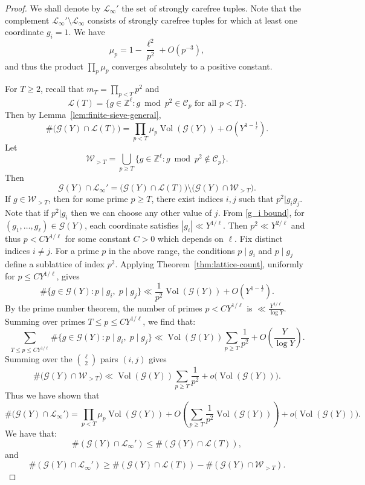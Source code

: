 \documentclass[10pt,a4paper]{amsart}
\begin{document}
\begin{proof}
We shall denote by $\mathcal L_\infty'$ the set of strongly carefree tuples. Note that the complement $\mathcal L_\infty'\setminus \mathcal L_\infty$ consists of strongly carefree tuples for which at least one coordinate $g_i=1$. We have
\[
\mu_p
=
1-\frac{\ell^2}{p^2}
+O(p^{-3}),
\]and thus the product $\prod_p\mu_p$ converges absolutely to a positive constant.
\par For $T\ge2$, recall that $m_T=\prod_{p<T}p^2$ and 
\[\mathcal L(T)
=
\{g\in\mathbb Z^\ell :
g\bmod p^2\in\mathcal C_p
\text{ for all } p<T\}.
\]
Then by Lemma~\ref{lem:finite-sieve-general},
\[
\#\bigl(\mathcal G(Y)\cap\mathcal L(T)\bigr)
=
\prod_{p<T} \mu_p\operatorname{Vol}(\mathcal G(Y))
+
O\!\left(Y^{1-\frac1\ell}\right).
\]Let
\[
\mathcal W_{>T}
=
\bigcup_{p\ge T}
\{g\in\mathbb Z^\ell :
g\bmod p^2\notin\mathcal C_p\}.
\]
Then
\[
\mathcal G(Y)\cap\mathcal L_\infty'
=
\bigl(\mathcal G(Y)\cap\mathcal L(T)\bigr)
\setminus
\bigl(\mathcal G(Y)\cap\mathcal W_{>T}\bigr).
\]
\noindent If $g\in\mathcal W_{>T}$,
then for some prime $p\ge T$, there exist indices $i,j$ such that $p^2 |g_i g_j$. Note that if $p^2|g_i$ then we can choose any other value of $j$. From \eqref{g_i bound}, for $(g_1, \dots, g_\ell)\in \mathcal G(Y)$, each coordinate satisfies $|g_i|\ll Y^{1/\ell}$. Then $p^2\ll Y^{2/\ell}$ and thus $p<CY^{1/\ell}$ for some constant $C>0$ which depends on $\ell$. 
Fix distinct indices $i\neq j$.
For a prime $p$ in the above range,
the conditions $p\mid g_i$ and $p\mid g_j$
define a sublattice of index $p^2$.
Applying Theorem~\ref{thm:lattice-count},
uniformly for $p\le CY^{1/\ell}$,
gives
\[
\#\{g\in\mathcal G(Y): p\mid g_i,\; p\mid g_j\}
\ll
\frac{1}{p^2}
\operatorname{Vol}(\mathcal G(Y))
+
O\!\left(Y^{1-\frac1\ell}\right).
\]
\noindent By the prime number theorem, the number of primes $p<C Y^{1/\ell}$ is $\ll \frac{Y^{1/\ell}}{\log Y}$. Summing over primes $T\le p\le CY^{1/\ell}$, we find that:
\[
\sum_{T\le p\le CY^{1/\ell}}
\#\{g\in\mathcal G(Y): p\mid g_i,\; p\mid g_j\}
\ll
\operatorname{Vol}(\mathcal G(Y))
\sum_{p\ge T}\frac1{p^2}
+
O\!\left(
\frac{Y}{\log Y}
\right).
\]
Summing over the $\binom{\ell}{2}$ pairs $(i,j)$ gives
\[
\#\bigl(\mathcal G(Y)\cap\mathcal W_{>T}\bigr)
\ll
\operatorname{Vol}(\mathcal G(Y))\sum_{p\ge T}\frac1{p^2}
+
o\!\bigl(\operatorname{Vol}(\mathcal G(Y))\bigr).
\]
Thus we have shown that 
\begin{equation}\label{liminf eqn}
\#\bigl(\mathcal G(Y)\cap\mathcal L_\infty'\bigr)
=
\prod_{p<T} \mu_p\operatorname{Vol}(\mathcal G(Y))
+
O\!\left(\sum_{p\geq T} \frac{1}{p^2}\operatorname{Vol}(\mathcal G(Y)) 
\right)
+
o\!\bigl(\operatorname{Vol}(\mathcal G(Y))\bigr).
\end{equation}
We have that:
\[
\#(\mathcal G(Y)\cap\mathcal L_\infty')
\le
\#(\mathcal G(Y)\cap\mathcal L(T)),
\]
and
\[
\#(\mathcal G(Y)\cap\mathcal L_\infty')
\ge
\#(\mathcal G(Y)\cap\mathcal L(T))
-
\#(\mathcal G(Y)\cap\mathcal W_{>T}).
\]


\end{proof}
\end{document}

